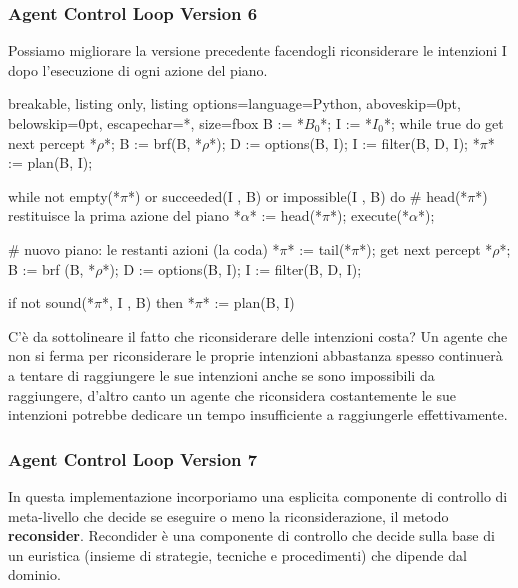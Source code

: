 \newpage

\subsubsection{Agent Control Loop Version 6}
Possiamo migliorare la versione precedente facendogli riconsiderare le intenzioni I dopo l'esecuzione di ogni azione del piano.

\begin{tcblisting}{breakable, listing only, listing options={language=Python, aboveskip=0pt, belowskip=0pt, escapechar=*}, size=fbox}
B := *$B_0$*;
I := *$I_0$*;
while true do
    get next percept *$\rho$*;
    B := brf(B, *$\rho$*);
    D := options(B, I);
    I := filter(B, D, I);
    *$\pi$* := plan(B, I);
    
    while not empty(*$\pi$*) or
         succeeded(I , B) or
         impossible(I , B) do
        # head(*$\pi$*) restituisce la prima azione del piano 
        *$\alpha$* := head(*$\pi$*);
        execute(*$\alpha$*);
        
        # nuovo piano: le restanti azioni (la coda)
        *$\pi$* := tail(*$\pi$*);
        get next percept *$\rho$*;
        B := brf (B, *$\rho$*);
        D := options(B, I);
        I := filter(B, D, I);
        
        if not sound(*$\pi$*, I , B) then
            *$\pi$* := plan(B, I)
\end{tcblisting}

C'è da sottolineare il fatto che riconsiderare delle intenzioni costa? Un agente che non si ferma per riconsiderare le proprie intenzioni abbastanza spesso continuerà a tentare di raggiungere le sue intenzioni anche se sono impossibili da raggiungere, d'altro canto un agente che riconsidera costantemente le sue intenzioni potrebbe dedicare un tempo insufficiente a raggiungerle effettivamente.

\subsubsection{Agent Control Loop Version 7}
In questa implementazione incorporiamo una esplicita componente di controllo di meta-livello che decide se eseguire o meno la riconsiderazione, il metodo \textbf{reconsider}. Recondider è una componente di controllo che decide sulla base di un euristica (insieme di strategie, tecniche e procedimenti) che dipende dal dominio.

